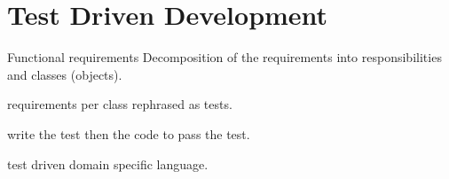 \documentclass[\docroot/main]{subfiles}
\begin{document}
\section{Test Driven Development}

Functional requirements
Decomposition  of the requirements into responsibilities and classes (objects).

requirements per class rephrased as tests.

write the test then the code to pass the test.

test driven domain specific language.
\end{document}
